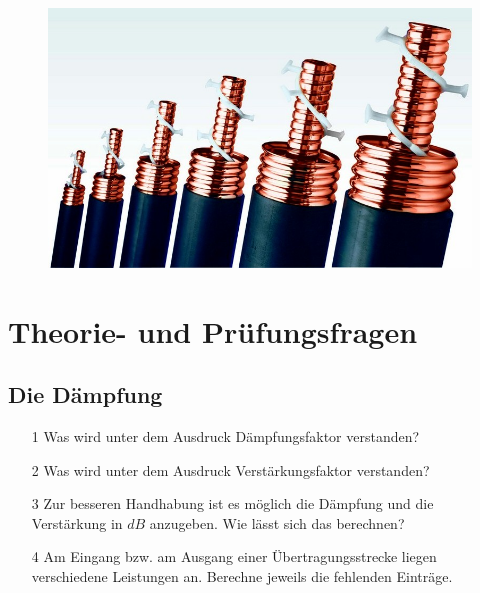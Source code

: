 \begin{figure}
 \vspace{-6cm}
  \includegraphics[scale=0.2]{DDK/Bilder/Cables.jpg}
 \vspace{-6cm}
\end{figure}

\section*{Theorie- und Prüfungsfragen}

\subsection*{Die Dämpfung}

\begin{enumerate} 
\itemsep1pt\parskip0pt
\item[1] Was wird unter dem Ausdruck Dämpfungsfaktor verstanden?
\item[2] Was wird unter dem Ausdruck Verstärkungsfaktor verstanden?
\item[3] Zur besseren Handhabung ist es möglich die Dämpfung und die Verstärkung in $dB$ anzugeben. Wie lässt sich das berechnen?
\item[4] Am Eingang bzw. am Ausgang einer Übertragungsstrecke liegen verschiedene Leistungen an. Berechne jeweils die fehlenden Einträge.
\end{enumerate}

